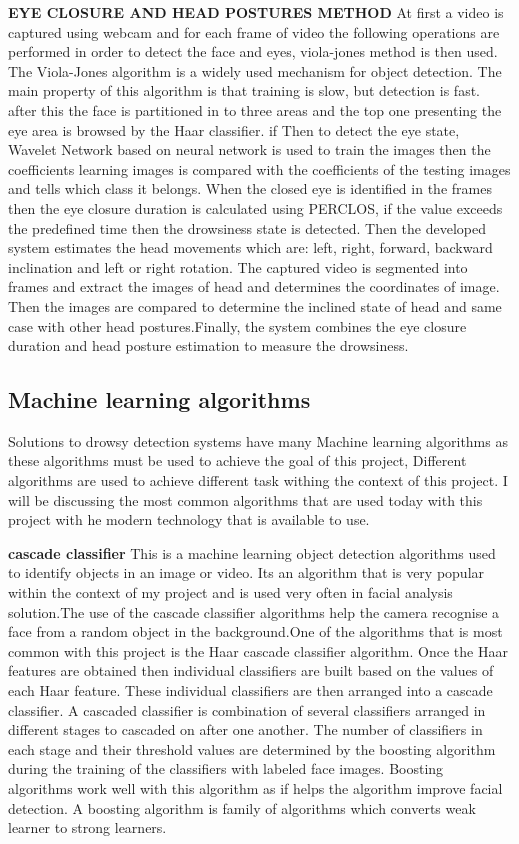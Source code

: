 \textbf{EYE CLOSURE AND HEAD POSTURES METHOD} 
 At first a  video is captured using webcam and for each frame of video the following operations are performed in order to detect the face and eyes, viola-jones method is then used. The Viola-Jones algorithm is a widely used mechanism for object detection. The main property of this algorithm is that training is slow, but detection is fast. after this the face is partitioned in to three areas and the top one presenting the eye area is browsed by the Haar classifier.\cite{ramzan2019survey} if Then to detect the eye state, Wavelet Network based on neural network is used to train the images then the coefficients learning images is compared with the coefficients of the testing images and tells which class it belongs. When the closed eye is identified in the frames then the eye closure duration is calculated using PERCLOS, if the value exceeds the predefined time then the drowsiness state is detected. Then the developed system estimates the head movements which are: left, right, forward, backward inclination and left or right rotation. The captured video is segmented into frames and extract the images of head and determines the coordinates of image. Then the images are compared to determine the inclined state of head and same case with other head postures.Finally, the system combines the eye closure duration and head posture estimation to measure the drowsiness. \cite{ramzan2019survey}

{
\subsection{Machine learning algorithms}
}
Solutions to drowsy detection systems have many Machine learning algorithms as these algorithms must be used to achieve the goal of this project, Different algorithms are used to achieve different task withing the context of this project. I will be discussing the most common algorithms that are used today with this project with he modern technology that is available to use.

\textbf{ cascade classifier}
This is a machine learning object detection algorithms used to identify objects in an image or video. Its an algorithm that is very popular within the context of my project and is used very often in facial analysis solution\cite{inproceedings}.The use of the cascade classifier algorithms help the camera recognise a face from a random object in the background.One of the algorithms that is most common with this project is the Haar cascade classifier algorithm. Once   the   Haar   features   are   obtained  then  individual  classifiers  are  built  based  on  the  values  of  each  Haar  feature.  These  individual  classifiers  are  then arranged into a cascade classifier. A cascaded classifier is combination  of  several  classifiers  arranged in different  stages to cascaded on after one another. The number of classifiers in each stage and their threshold values are determined by the boosting algorithm during the training of the classifiers with labeled face images. Boosting algorithms work well with this algorithm as if helps the algorithm improve facial detection. A boosting algorithm is  family of algorithms which converts weak learner to strong learners. \cite{inproceedings1}


